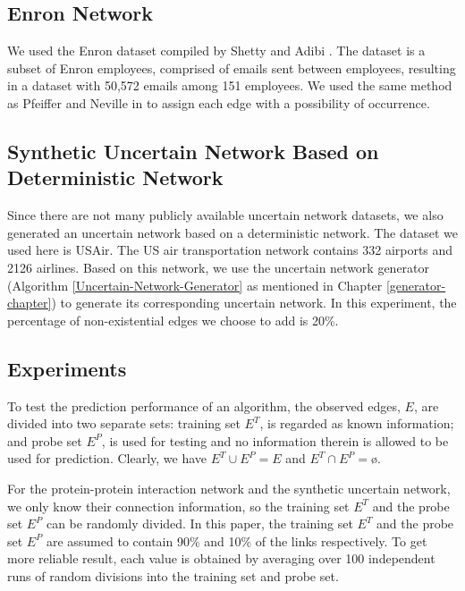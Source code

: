 \documentclass[\main/thesis.tex]{subfiles}
\begin{document}
\subsection*{Enron Network}
We used the Enron dataset compiled by Shetty and Adibi \cite{shetty2004enron}. The dataset is a subset of Enron employees, comprised of emails sent between employees, resulting in a dataset with 50,572 emails among 151 employees. We used the same method as Pfeiffer and Neville in  \cite{pfeiffer2010probabilistic} to assign each edge with a possibility of occurrence. 

\subsection*{Synthetic Uncertain Network Based on Deterministic Network} \label{Synthetic-Uncertain-Network-Based-on-Deterministic-Network}
Since there are not many publicly available uncertain network datasets, we also generated an uncertain network based on a deterministic network. The dataset we used here is USAir. The US air transportation network contains 332 airports and 2126 airlines. Based on this network, we use the uncertain network generator  (Algorithm \ref{Uncertain-Network-Generator} as mentioned in Chapter \ref{generator-chapter}) to generate its corresponding uncertain network. In this experiment, the percentage of non-existential edges we choose to add is 20\%.

\subsection{Experiments}

To test the prediction performance of an algorithm, the observed edges, $E$, are divided into two separate sets: training set $E^T$, is regarded as known information; and probe set $E^P$, is used for testing and no information therein is allowed to be used for prediction. Clearly, we have $E^T \cup E^P = E$ and $E^T \cap E^P = $\o. 

For the protein-protein interaction network and the synthetic uncertain network, we only know their connection information, so the training set $E^T$ and the probe set $E^P$ can be randomly divided. In this paper, the training set $E^T$ and the probe set $E^P$ are assumed to contain 90\% and 10\% of the links respectively. To get more reliable result, each value is obtained by averaging over 100 independent runs of random divisions into the training set and probe set.
\end{document}
